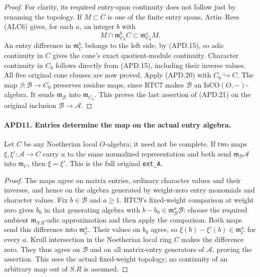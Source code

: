 \documentclass[11pt,a4paper]{article}
\numberwithin{equation}{section}
\theoremstyle{remark}\newtheorem{remark}[theorem]{Remark}
\begin{document}
\begin{proof}
For clarity, its required entry-span continuity does not follow
just by renaming the topology.  If
\(M\subset C\) is one of the finite entry spans, Artin--Rees
(ALC6) gives, for each \(a\), an integer \(b\) with
\[
 M\cap\mathfrak m_{C_0}^{b}C
                         \subset\mathfrak m_{C_0}^{a}M.
                                                               \tag{APD.22}
\]
An entry difference in \(\mathfrak m_C^b\) belongs to the
left side, by (APD.15), so adic continuity in \(C\) gives the
cone's exact quotient-module continuity.  Character continuity
in \(C_0\) follows directly from (APD.15), including their
inverse values.  All five original cone clauses are now proved.
Apply (APD.20) with \(C_0\hookrightarrow C\).
The map \(\beta:\mathcal B\to C_0\) preserves residue
maps, since RTC7 makes \(\mathcal B\) an
\(\mathrm{IsCO}(O,-)\)-algebra.  It sends
\(\mathfrak m_{\mathcal B}\) into \(\mathfrak m_{C_0}\).
This proves the last assertion of (APD.21) on the original
inclusion \(\mathcal B\to\mathcal A\).
\end{proof}

\paragraph{APD11. Entries determine the map on the actual entry algebra.}
\label{claim:APD11}
Let \(C\) be any Noetherian local \(O\)-algebra; it need not
be complete.  If two maps \(\xi,\xi':\mathcal A\to C\)
carry \(u\) to the same normalized representation and both send
\(\mathfrak m_{\mathcal B}\mathcal A\) into \(\mathfrak m_C\),
then \(\xi=\xi'\).  This is the full original \texttt{ext\_\allowbreak A}.

\begin{proof}
The maps agree on matrix entries, ordinary character values and
their inverses, and hence on the algebra generated by weight-zero
entry monomials and character values.  Fix \(b\in\mathcal B\)
and \(a\ge1\).  RTC9's fixed-weight comparison at weight zero
gives \(b_0\) in that generating algebra with
\(b-b_0\in\mathfrak m_{\mathcal B}^{a}\mathcal B\): choose
the required ambient \(\mathfrak m_{S.R}\)-adic approximation
and then apply the comparison.  Both maps send this difference
into \(\mathfrak m_C^a\).  Their values on \(b_0\) agree,
so \(\xi(b)-\xi'(b)\in\mathfrak m_C^a\) for every \(a\).
Krull intersection in the Noetherian local ring \(C\) makes
the difference zero.  They thus agree on \(\mathcal B\) and
on all matrix-entry generators of \(\mathcal A\), proving
the assertion.  This uses the actual fixed-weight topology; no
continuity of an arbitrary map out of \(S.R\) is assumed.
\end{proof}
\end{document}
